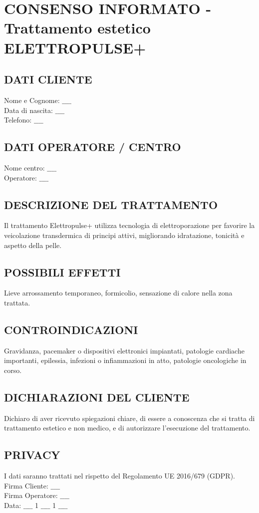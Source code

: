 
\newpage

\section{CONSENSO INFORMATO - Trattamento estetico ELETTROPULSE+}
\subsection{DATI CLIENTE}
Nome e Cognome: $\_\_\_\_$\\
Data di nascita: $\_\_\_\_$\\
Telefono: $\_\_\_\_$

\subsection{DATI OPERATORE / CENTRO}
Nome centro: $\_\_\_\_$\\
Operatore: $\_\_\_\_$

\subsection{DESCRIZIONE DEL TRATTAMENTO}
Il trattamento Elettropulse+ utilizza tecnologia di elettroporazione per favorire la veicolazione transdermica di principi attivi, migliorando idratazione, tonicità e aspetto della pelle.

\subsection{POSSIBILI EFFETTI}
Lieve arrossamento temporaneo, formicolio, sensazione di calore nella zona trattata.

\subsection{CONTROINDICAZIONI}
Gravidanza, pacemaker o dispositivi elettronici impiantati, patologie cardiache importanti, epilessia, infezioni o infiammazioni in atto, patologie oncologiche in corso.

\subsection{DICHIARAZIONI DEL CLIENTE}
Dichiaro di aver ricevuto spiegazioni chiare, di essere a conoscenza che si tratta di trattamento estetico e non medico, e di autorizzare l'esecuzione del trattamento.

\subsection{PRIVACY}
I dati saranno trattati nel rispetto del Regolamento UE 2016/679 (GDPR).\\
Firma Cliente: $\_\_\_\_$\\
Firma Operatore: $\_\_\_\_$\\
Data: $\_\_\_\_$ 1 $\_\_\_\_$ 1 $\_\_\_\_$
